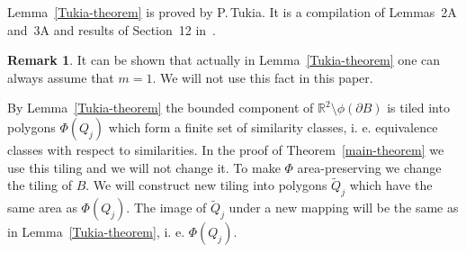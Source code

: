 \documentclass[12pt]{article}
\theoremstyle{definition}
\newtheorem{rema}[prop]{Remark}
\begin{document}
Lemma~\ref{Tukia-theorem} is proved by P.\,Tukia. It is a compilation of Lemmas~2A and~3A and results of Section~12 in~\cite{Tuk}. 

\begin{rema}
It can be shown that actually in Lemma~\ref{Tukia-theorem} one can always assume that $m=1$. We will not use this fact in this paper.
\end{rema}

By Lemma~\ref{Tukia-theorem} the bounded component of $\mathbb R^2\setminus\phi(\partial B)$ is tiled into polygons $\Phi(Q_j)$ which form a finite set of similarity classes, i. e. equivalence classes with respect to similarities. In the proof of Theorem~\ref{main-theorem} we use this tiling and we will not change it. To make $\Phi$ area-preserving we change the tiling of $B$. We will construct new tiling into polygons $\widetilde Q_j$ which have the same area as $\Phi(Q_j).$ The image of $\widetilde Q_j$ under a new mapping will be the same as in Lemma~\ref{Tukia-theorem}, i. e. $\Phi(Q_j).$


\end{document}
